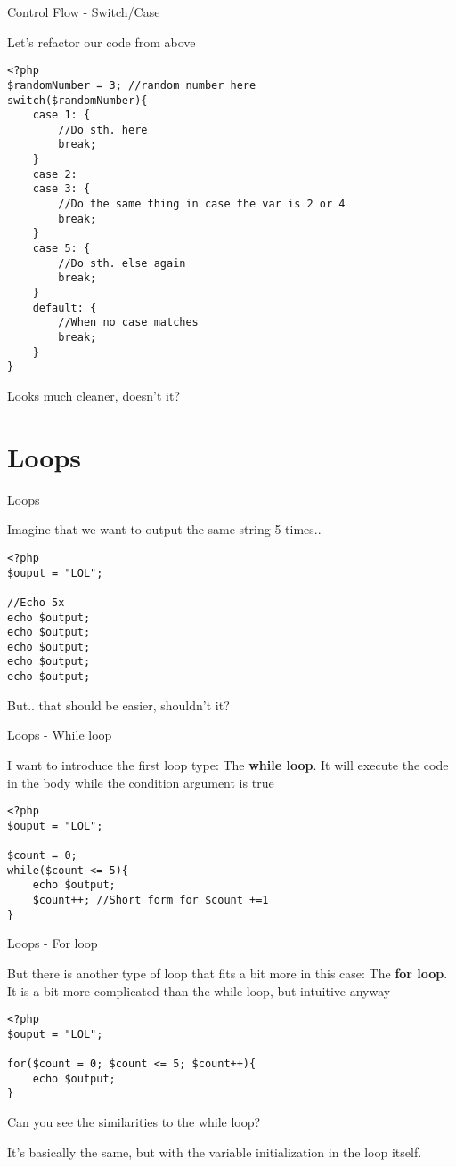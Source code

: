 \begin{frame}[fragile]{Control Flow - Switch/Case}

Let's refactor our code from above
\begin{lstlisting}
<?php
$randomNumber = 3; //random number here
switch($randomNumber){
	case 1: {
		//Do sth. here
		break;
	}
	case 2:
	case 3: {
		//Do the same thing in case the var is 2 or 4
		break;
	}
	case 5: {
		//Do sth. else again
		break;
	}
	default: {
		//When no case matches
		break;
	}
}
\end{lstlisting} 
\pause

Looks much cleaner, doesn't it?

\end{frame}

\section{Loops}

\begin{frame}[fragile]{Loops}

Imagine that we want to output the same string 5 times.. \pause

\begin{lstlisting}
<?php
$ouput = "LOL";

//Echo 5x
echo $output;
echo $output;
echo $output;
echo $output;
echo $output;
\end{lstlisting} 
\pause

But.. that should be easier, shouldn't it?

\end{frame}


\begin{frame}[fragile]{Loops - While loop}

I want to introduce the first loop type: The \textbf{while loop}.
It will execute the code in the body while the condition argument is true  \pause

\begin{lstlisting}
<?php
$ouput = "LOL";

$count = 0;
while($count <= 5){
	echo $output;
	$count++; //Short form for $count +=1
}
\end{lstlisting} 

\end{frame}

\begin{frame}[fragile]{Loops - For loop}

But there is another type of loop that fits a bit more in this case: The \textbf{for loop}.
It is a bit more complicated than the while loop, but intuitive anyway\pause

\begin{lstlisting}
<?php
$ouput = "LOL";

for($count = 0; $count <= 5; $count++){
	echo $output;
}
\end{lstlisting} \pause

Can you see the similarities to the while loop?

It's basically the same, but with the variable initialization in the loop itself.
\end{frame}

